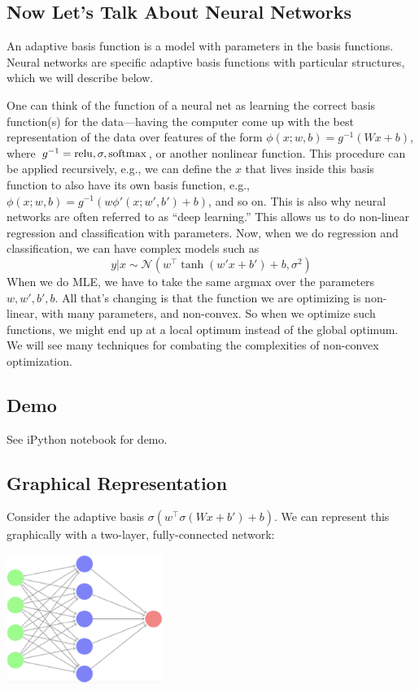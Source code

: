 \documentclass{article}
\begin{document}
\subsection{Now Let's Talk About Neural Networks}

An adaptive basis function is a model with parameters in the basis functions. Neural networks are specific adaptive basis functions with particular structures, which we will describe below.

One can think of the function of a neural net as learning the correct basis function(s) for the data---having the computer come up with the best representation of the data over features of the form $\phi(x; w, b) = g^{-1}(Wx + b)$, where $g^{-1} = \operatorname{relu}, \sigma, \operatorname{softmax}$, or another nonlinear function. This procedure can be applied recursively, e.g., we can define the $x$ that lives inside this basis function to also have its own basis function, e.g., $\phi(x; w, b) = g^{-1}(w\phi'(x; w', b') + b)$, and so on. This is also why neural networks are often referred to as ``deep learning.'' This allows us to do non-linear regression and classification with parameters. Now, when we do regression and classification, we can have complex models such as
$$y | x \sim \mathcal{N}(w^\top\tanh(w'x + b') + b, \sigma^2)$$
When we do MLE, we have to take the same argmax over the parameters $w, w', b', b$. All that's changing is that the function we are optimizing is non-linear, with many parameters, and non-convex. So when we optimize such functions, we might end up at a local optimum instead of the global optimum. We will see many techniques for combating the complexities of non-convex optimization.

\subsection{Demo}

See iPython notebook for demo.

\subsection{Graphical Representation}

Consider the adaptive basis $\sigma(w^\top \sigma(Wx + b') + b)$. We can represent this graphically with a two-layer, fully-connected network:

\begin{center}
    \includegraphics[width=2in]{7/neural-network.png}
\end{center}
\end{document}
